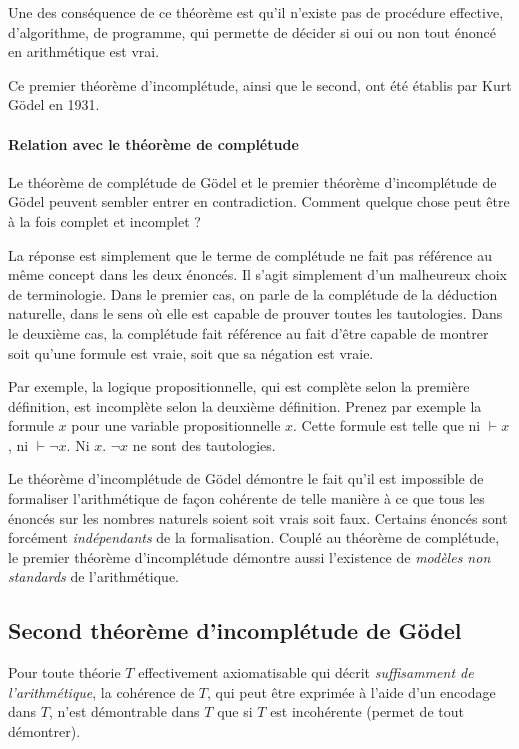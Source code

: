 Une des conséquence de ce théorème est qu'il n'existe pas de procédure effective, d'algorithme, de programme, qui permette de décider si oui ou non tout énoncé en arithmétique est vrai.

Ce premier théorème d'incomplétude, ainsi que le second, ont été établis par Kurt Gödel en 1931.

\paragraph{Relation avec le théorème de complétude}

Le théorème de complétude de Gödel et le premier théorème d'incomplétude de Gödel peuvent sembler entrer en contradiction.
Comment quelque chose peut être à la fois complet et incomplet ?

La réponse est simplement que le terme de complétude ne fait pas référence au même concept dans les deux énoncés.
Il s'agit simplement d'un malheureux choix de terminologie.
Dans le premier cas, on parle de la complétude de la déduction naturelle, dans le sens où elle est capable de prouver toutes les tautologies.
Dans le deuxième cas, la complétude fait référence au fait d'être capable de montrer soit qu'une formule est vraie, soit que sa négation est vraie.

Par exemple, la logique propositionnelle, qui est complète selon la première définition, est incomplète selon la deuxième définition.
Prenez par exemple la formule $x$ pour une variable propositionnelle $x$. Cette formule est telle que ni $\vdash x$, ni $\vdash \neg x$. Ni $x$. $\neg x$ ne sont des tautologies.

Le théorème d'incomplétude de Gödel démontre le fait qu'il est impossible de formaliser l'arithmétique de façon cohérente de telle manière à ce que tous les énoncés sur les nombres naturels soient soit vrais soit faux.
Certains énoncés sont forcément \emph{indépendants} de la formalisation.
Couplé au théorème de complétude, le premier théorème d'incomplétude démontre aussi l'existence de \emph{modèles non standards} de l'arithmétique.

\subsection{Second théorème d'incomplétude de Gödel}

Pour toute théorie $T$ effectivement axiomatisable qui décrit \textit{suffisamment de l'arithmétique}, la cohérence de $T$, qui peut être exprimée à l'aide d'un encodage dans $T$, n'est démontrable dans $T$ que si $T$ est incohérente (permet de tout démontrer).
